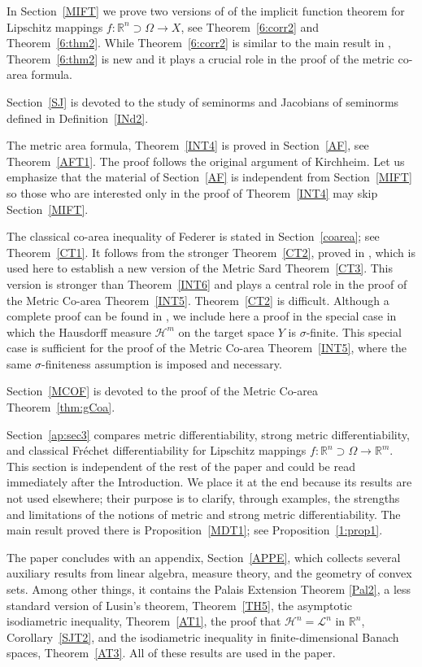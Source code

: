 \documentclass[12pt,leqno]{amsart}
\theoremstyle{definition}
\newcommand{\bbbr}{\mathbb R}
\def\H{{\mathcal H}}
\def\LL{{\mathcal L}}
\numberwithin{theorem}{section} \numberwithin{equation}{section}
\begin{document}
In Section~\ref{MIFT} we prove two versions of of the implicit function theorem for Lipschitz mappings $f:\bbbr^n\supset\Omega\to X$, see Theorem~\ref{6:corr2} and Theorem~\ref{6:thm2}. While Theorem~\ref{6:corr2} is similar to the main result in \cite{HZ}, Theorem~\ref{6:thm2} is new and it plays a crucial role in the proof of the metric co-area formula.

Section~\ref{SJ} is devoted to the study of seminorms and Jacobians of seminorms defined in Definition~\ref{INd2}.

The metric area formula, Theorem~\ref{INT4} is proved in Section~\ref{AF}, see Theorem~\ref{AFT1}. The proof follows the original argument of Kirchheim. Let us emphasize that the material of Section~\ref{AF} is independent from Section~\ref{MIFT} so those who are interested only in the proof of Theorem~\ref{INT4} may skip Section~\ref{MIFT}.


The classical co-area inequality of Federer is stated in Section~\ref{coarea}; see Theorem~\ref{CT1}.
It follows from the stronger Theorem~\ref{CT2}, proved in \cite{EH1}, which is used here to establish a new version of the Metric Sard Theorem~\ref{CT3}. This version is stronger than Theorem~\ref{INT6} and plays a central role in the proof of the Metric Co-area Theorem~\ref{INT5}.
Theorem~\ref{CT2} is difficult. Although a complete proof can be found in \cite{EH1}, we include here a proof in the special case in which the Hausdorff measure $\H^m$ on the target space $Y$ is $\sigma$-finite. This special case is sufficient for the proof of the Metric Co-area Theorem~\ref{INT5}, where the same $\sigma$-finiteness assumption is imposed and necessary.

Section~\ref{MCOF} is devoted to the proof of the Metric Co-area Theorem~\ref{thm:gCoa}.

Section~\ref{ap:sec3} compares metric differentiability, strong metric differentiability, and classical Fr\'echet differentiability for Lipschitz mappings $f:\bbbr^n\supset\Omega\to\bbbr^m$. This section is independent of the rest of the paper and could be read immediately after the Introduction. We place it at the end because its results are not used elsewhere; their purpose is to clarify, through examples, the strengths and limitations of the notions of metric and strong metric differentiability. The main result proved there is Proposition~\ref{MDT1}; see Proposition~\ref{1:prop1}.

The paper concludes with an appendix, Section~\ref{APPE}, which collects several auxiliary results from linear algebra, measure theory, and the geometry of convex sets. Among other things, it contains
the Palais Extension Theorem \ref{Pal2},
a less standard version of Lusin's theorem, Theorem~\ref{TH5}, the asymptotic isodiametric inequality, Theorem~\ref{AT1}, the proof that $\H^n=\LL^n$ in $\bbbr^n$, Corollary~\ref{SJT2}, and the isodiametric inequality in finite-dimensional Banach spaces, Theorem~\ref{AT3}. All of these results are used in the paper.
\end{document}
